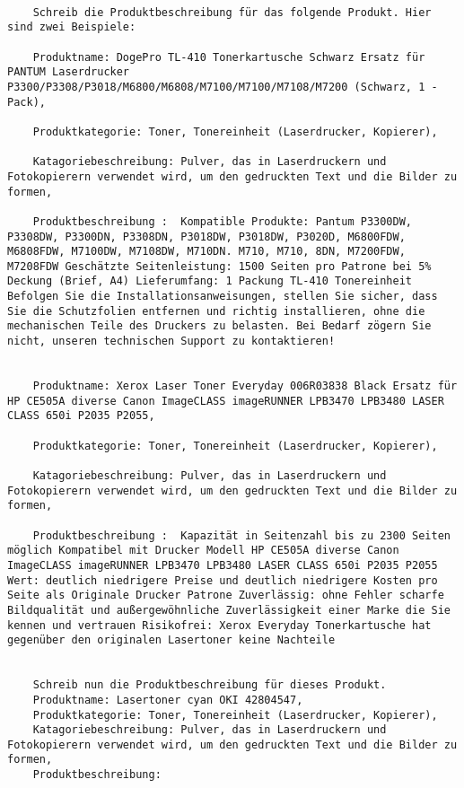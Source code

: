 {\tiny
\begin{lstlisting}[breaklines=true, caption={a sample prompt}, captionpos=b]
	
	Schreib die Produktbeschreibung für das folgende Produkt. Hier sind zwei Beispiele:
	
	Produktname: DogePro TL-410 Tonerkartusche Schwarz Ersatz für PANTUM Laserdrucker P3300/P3308/P3018/M6800/M6808/M7100/M7100/M7108/M7200 (Schwarz, 1 -Pack),
	
	Produktkategorie: Toner, Tonereinheit (Laserdrucker, Kopierer),
	
	Katagoriebeschreibung: Pulver, das in Laserdruckern und Fotokopierern verwendet wird, um den gedruckten Text und die Bilder zu formen,
	
	Produktbeschreibung :  Kompatible Produkte: Pantum P3300DW, P3308DW, P3300DN, P3308DN, P3018DW, P3018DW, P3020D, M6800FDW, M6808FDW, M7100DW, M7108DW, M710DN. M710, M710, 8DN, M7200FDW, M7208FDW Geschätzte Seitenleistung: 1500 Seiten pro Patrone bei 5% Deckung (Brief, A4) Lieferumfang: 1 Packung TL-410 Tonereinheit Befolgen Sie die Installationsanweisungen, stellen Sie sicher, dass Sie die Schutzfolien entfernen und richtig installieren, ohne die mechanischen Teile des Druckers zu belasten. Bei Bedarf zögern Sie nicht, unseren technischen Support zu kontaktieren!
	
	
	Produktname: Xerox Laser Toner Everyday 006R03838 Black Ersatz für HP CE505A diverse Canon ImageCLASS imageRUNNER LPB3470 LPB3480 LASER CLASS 650i P2035 P2055,
	
	Produktkategorie: Toner, Tonereinheit (Laserdrucker, Kopierer),
	
	Katagoriebeschreibung: Pulver, das in Laserdruckern und Fotokopierern verwendet wird, um den gedruckten Text und die Bilder zu formen,
	
	Produktbeschreibung :  Kapazität in Seitenzahl bis zu 2300 Seiten möglich Kompatibel mit Drucker Modell HP CE505A diverse Canon ImageCLASS imageRUNNER LPB3470 LPB3480 LASER CLASS 650i P2035 P2055 Wert: deutlich niedrigere Preise und deutlich niedrigere Kosten pro Seite als Originale Drucker Patrone Zuverlässig: ohne Fehler scharfe Bildqualität und außergewöhnliche Zuverlässigkeit einer Marke die Sie kennen und vertrauen Risikofrei: Xerox Everyday Tonerkartusche hat gegenüber den originalen Lasertoner keine Nachteile 
	
	
	Schreib nun die Produktbeschreibung für dieses Produkt.
	Produktname: Lasertoner cyan OKI 42804547,
	Produktkategorie: Toner, Tonereinheit (Laserdrucker, Kopierer),
	Katagoriebeschreibung: Pulver, das in Laserdruckern und Fotokopierern verwendet wird, um den gedruckten Text und die Bilder zu formen,
	Produktbeschreibung:
	
\end{lstlisting}
}


